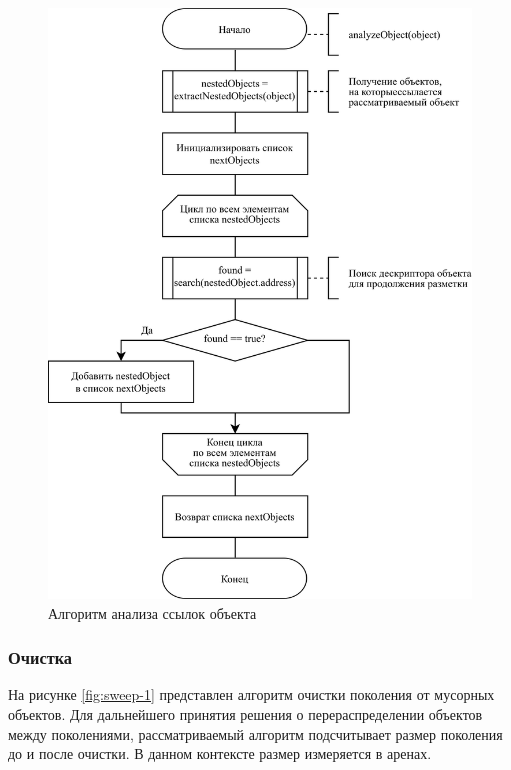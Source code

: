 \begin{figure}[H]
	\centering
	\includegraphics[scale=0.185]{assets/mark-5.png}
	\caption{Алгоритм анализа ссылок объекта}
	\label{fig:mark-5}
\end{figure}

\subsubsection*{Очистка}

На рисунке \ref{fig:sweep-1} представлен алгоритм очистки поколения от мусорных объектов. Для дальнейшего принятия решения о перераспределении объектов между поколениями, рассматриваемый алгоритм подсчитывает размер поколения до и после очистки. В данном контексте размер измеряется в аренах.


